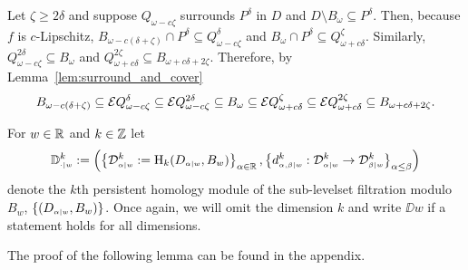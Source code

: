 


Let $\zeta\geq 2\delta$ and suppose $Q_{\omega-c\zeta}$ surrounds $P^\delta$ in $D$ and $D\setminus B_\omega\subseteq P^\delta$.
Then, because $f$ is $c$-Lipschitz, $B_{\omega-c(\delta+\zeta)}\cap P^\delta\subseteq Q_{\omega-c\zeta}^\delta$ and $B_\omega\cap P^\delta\subseteq Q_{\omega+c\delta}^\zeta$.
Similarly, $Q_{\omega-c\zeta}^{2\delta}\subseteq B_\omega$ and $Q_{\omega+c\delta}^{2\zeta}\subseteq B_{\omega+c{\delta+2\zeta}}$.
Therefore, by Lemma~\ref{lem:surround_and_cover}
\[ B_{\omega-c(\delta+\zeta)}\subseteq \E Q_{\omega-c\zeta}^\delta\subseteq\E Q_{\omega-c\zeta}^{2\delta}\subseteq B_\omega
  \subseteq \E Q_{\omega+c\delta}^\zeta\subseteq \E Q_{\omega+c\delta}^{2\zeta}\subseteq B_{\omega+c{\delta+2\zeta}}.\]


For $w\in\R$ and $k\in\Z$ let
\[ \DD{w}^k := \left(\left\{\D{w}{\alpha}^k := \hom_k(D\subi{w}{\alpha},B_w)\right\}_{\alpha\in\R},\left\{d\subi{w}{\alpha,\beta}^k : \D{w}{\alpha}^k\to\D{w}{\beta}^k\right\}_{\alpha\leq\beta}\right)\]
denote the $k$th persistent homology module of the sub-levelset filtration modulo $B_w$, $\{(D\subi{w}{\alpha},B_w)\}$.
Once again, we will omit the dimension $k$ and write $\DD{w}$ if a statement holds for all dimensions.

The proof of the following lemma can be found in the appendix.

